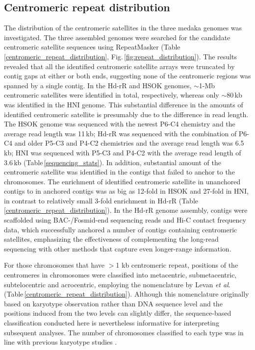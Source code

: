 \subsection*{Centromeric repeat distribution}
  The distribution of the centromeric satellites in the three medaka genomes was investigated. The three assembled genomes were searched for the candidate centromeric satellite sequences using RepeatMasker (Table\,\ref{centromeric_repeat_distribution}, Fig.\,\ref{fig:repeat_distribution}). The results revealed that all the identified centromeric satellite arrays were truncated by contig gaps at either or both ends, suggesting none of the centromeric regions was spanned by a single contig. In the Hd-rR and HSOK genomes, $\sim$1-Mb centromeric satellites were identified in total, respectively, whereas only $\sim$80\,kb was identified in the HNI genome. This substantial difference in the amounts of identified centromeric satellite is presumably due to the difference in read length. The HSOK genome was sequenced with the newest P6-C4 chemistry and the average read length was 11\,kb; Hd-rR was sequenced with the combination of P6-C4 and older P5-C3 and P4-C2 chemistries and the average read length was 6.5\,kb; HNI was sequenced with P5-C3 and P4-C2 with the average read length of 3.6\,kb (Table\,\ref{sequencing_stats}). In addition, substantial amount of the centromeric satellite was identified in the contigs that failed to anchor to the chromosomes. The enrichment of identified centromeric satellite in unanchored contigs to in anchored contigs was as big as 12-fold in HSOK and 27-fold in HNI, in contrast to relatively small 3-fold enrichment in Hd-rR (Table\,\ref{centromeric_repeat_distribution}). In the Hd-rR genome assembly, contigs were scaffolded using BAC-/Fosmid-end sequencing reads and Hi-C contact frequency data, which successfully anchored a number of contigs containing centromeric satellites, emphasizing the effectiveness of complementing the long-read sequencing with other methods that capture even longer-range information.


  For those chromosomes that have $>$1 kb centromeric repeat, positions of the centromeres in chromosomes were classified into metacentric, submetacentric, subtelocentric and acrocentric, employing the nomenclature by Levan \textit{et al}. \cite{levan1964} (Table\,\ref{centromeric_repeat_distribution}). Although this nomenclature originally based on karyotype observation rather than DNA sequence level and the positions induced from the two levels can slightly differ, the sequence-based classification conducted here is  nevertheless informative for interpreting subsequent analyses. The number of chromosomes classified to each type was in line with previous karyotype studies \cite{Uwa1981, Uwa1990}.

